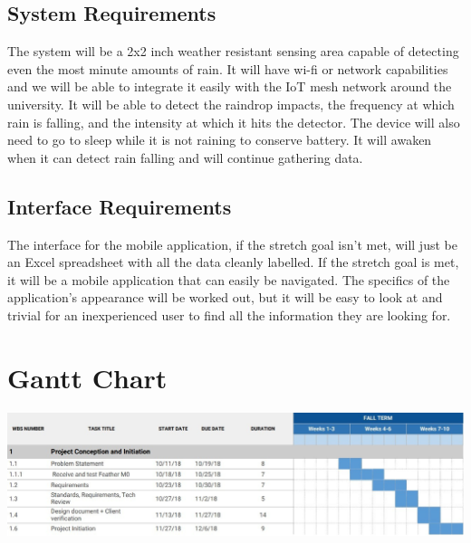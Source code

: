 \documentclass[letterpaper,10pt,draftclsnofoot,onecolumn]{article}
\begin{document}
\subsection{System Requirements}
The system will be a 2x2 inch weather resistant sensing area capable of detecting even the most minute amounts of rain. It will have wi-fi or network capabilities and we will be able to integrate it easily with the IoT mesh network around the university. It will be able to detect the raindrop impacts, the frequency at which rain is falling, and the intensity at which it hits the detector. The device will also need to go to sleep while it is not raining to conserve battery. It will awaken when it can detect rain falling and will continue gathering data.

\subsection{Interface Requirements}
The interface for the mobile application, if the stretch goal isn't met, will just be an Excel spreadsheet with all the data cleanly labelled. If the stretch goal is met, it will be a mobile application that can easily be navigated. The specifics of the application's appearance will be worked out, but it will be easy to look at and trivial for an inexperienced user to find all the information they are looking for.

\section{Gantt Chart}


\includegraphics[scale=0.55]{GanttChart.eps}
\newline



\end{document}
